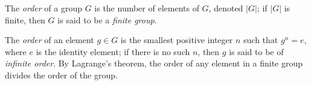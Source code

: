 \documentclass[12pt]{article}
\begin{document}
The {\em order} of a group $G$ is the number of elements of $G$, denoted $|G|$; if $|G|$ is finite, then $G$ is said to be a {\em finite group}. 

The {\em order} of an element $g \in G$ is the smallest positive integer $n$ such that $g^n=e$, where $e$ is the identity element; if there is no such $n$, then $g$ is said to be of {\em infinite order}.  By Lagrange's theorem, the order of any element in a finite group divides the order of the group.
\end{document}
